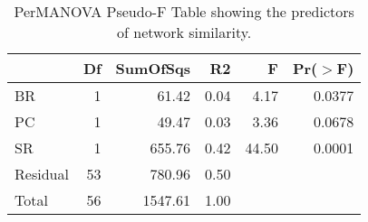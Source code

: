 \begin{table}[ht]
\centering
\begin{tabular}{lrrrrr}
  \hline
 & Df & SumOfSqs & R2 & F & Pr($>$F) \\ 
  \hline
BR & 1 & 61.42 & 0.04 & 4.17 & 0.0377 \\ 
  PC & 1 & 49.47 & 0.03 & 3.36 & 0.0678 \\ 
  SR & 1 & 655.76 & 0.42 & 44.50 & 0.0001 \\ 
  Residual & 53 & 780.96 & 0.50 &  &  \\ 
  Total & 56 & 1547.61 & 1.00 &  &  \\ 
   \hline
\end{tabular}
\caption{PerMANOVA Pseudo-F Table showing the predictors of network similarity.} 
\label{tab:cn_perm_ng}
\end{table}
